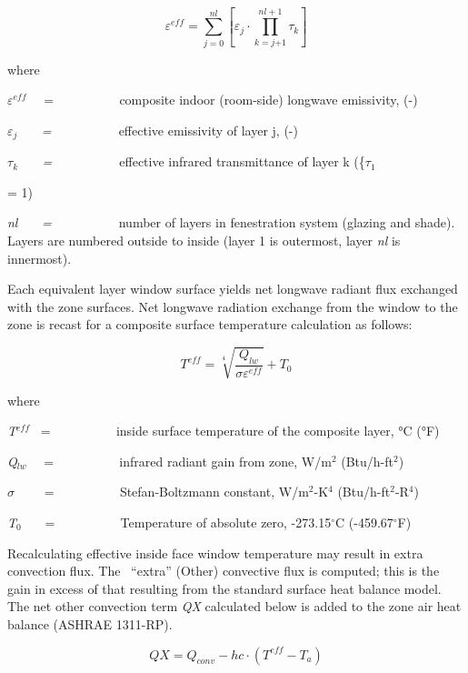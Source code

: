 {\begin{equation}
{\varepsilon ^{eff}} = \sum\limits_{j = 0}^{nl} {\left[ {{\varepsilon_j} \cdot \prod\limits_{k = j{ + 1}}^{nl + {1}} {{\tau_k}} } \right]}
\end{equation}

where

\emph{$\varepsilon$\(^{eff}\)}~~ = ~~~~~~~~~ composite indoor (room-side) longwave emissivity, (-)

\emph{$\varepsilon$\(_{j}\)~~~ = ~~~~~~~~~} effective emissivity of layer j, (-)

\emph{$\tau$\(_{k}\)~~~ = ~~~~~~~~~} effective infrared transmittance of layer k (\{$\tau$\(_{1}\)} = 1)

\emph{nl~~~ = ~~~~~~~~~} number of layers in fenestration system (glazing and shade). Layers are numbered outside to inside (layer 1 is outermost, layer \emph{nl} is innermost).

Each equivalent layer window surface yields net longwave radiant flux exchanged with the zone surfaces. Net longwave radiation exchange from the window to the zone is recast for a composite surface temperature calculation as follows:

\begin{equation}
{T^{eff}} = \sqrt[4]{{\frac{{{Q_{lw}}}}{{\sigma {\varepsilon ^{eff}}}}}} + {T_0}
\end{equation}

where

\emph{T\(^{eff}\)}~ = ~~~~~~~~~ inside surface temperature of the composite layer, °C (°F)

\emph{Q\(_{lw}\)}~~ = ~~~~~~~~~ infrared radiant gain from zone, W/m\(^{2}\) (Btu/h-ft\(^{2}\))

\emph{$\sigma$}~~~~ = ~~~~~~~~~ Stefan-Boltzmann constant, W/m\(^{2}\)-K\(^{4}\) (Btu/h-ft\(^{2}\)-R\(^{4}\))

\emph{T\(_{0}\)}~~~ = ~~~~~~~~~ Temperature of absolute zero, -273.15$^{\circ}$C (-459.67$^{\circ}$F)

Recalculating effective inside face window temperature may result in extra convection flux. The~ ``extra'' (Other) convective flux is computed; this is the gain in excess of that resulting from the standard surface heat balance model. The net other convection term \emph{QX} calculated below is added to the zone air heat balance (ASHRAE 1311-RP).

\begin{equation}
QX = {Q_{conv}} - hc \cdot ({T^{eff}} - {T_a})
\end{equation}

